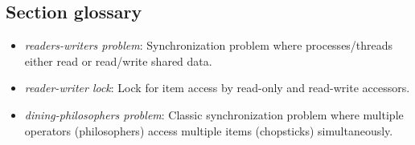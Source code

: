\subsection{Section glossary}
\begin{itemize}
    \item \textit{readers-writers problem}: Synchronization problem where processes/threads either read or read/write shared data.
    \item \textit{reader-writer lock}: Lock for item access by read-only and read-write accessors.
    \item \textit{dining-philosophers problem}: Classic synchronization problem where multiple operators (philosophers) access multiple items (chopsticks) simultaneously.
\end{itemize}
